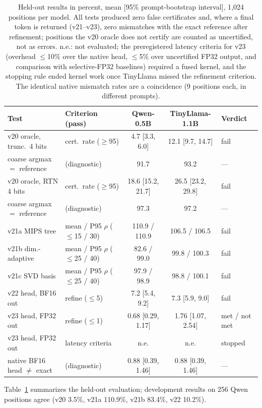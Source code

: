 \documentclass[11pt]{article}
\theoremstyle{definition}
\begin{document}
\begin{table}[t]
\centering
\scriptsize
\setlength{\tabcolsep}{4pt}
\begin{tabular}{llccl}
\toprule
Test & Criterion (pass) & Qwen-0.5B & TinyLlama-1.1B & Verdict\\
\midrule
v20 oracle, trunc.\ 4 bits & cert.\ rate ($\ge$95) & 4.7 [3.3, 6.0] & 12.1 [9.7, 14.7] & fail\\
\quad coarse argmax $=$ reference & (diagnostic) & 91.7 & 93.2 & ---\\
v20 oracle, RTN 4 bits & cert.\ rate ($\ge$95) & 18.6 [15.2, 21.7] & 26.5 [23.2, 29.8] & fail\\
\quad coarse argmax $=$ reference & (diagnostic) & 97.3 & 97.2 & ---\\
v21a MIPS tree & mean / P95 $\rho$ ($\le$15 / 30) & 110.9 / 110.9 & 106.5 / 106.5 & fail\\
v21b dim.-adaptive & mean / P95 $\rho$ ($\le$25 / 40) & 82.6 / 99.0 & 99.8 / 100.3 & fail\\
v21c SVD basis & mean / P95 $\rho$ ($\le$25 / 40) & 97.9 / 98.9 & 98.8 / 100.1 & fail\\
v22 head, BF16 out & refine ($\le$5) & 7.2 [5.4, 9.2] & 7.3 [5.9, 9.0] & fail\\
v23 head, FP32 out & refine ($\le$1) & 0.68 [0.29, 1.17] & 1.76 [1.07, 2.54] & met / not met\\
v23 head, FP32 out & latency criteria & n.e. & n.e. & stopped\\
\midrule
native BF16 head $\ne$ exact & (diagnostic) & 0.88 [0.39, 1.46] & 0.88 [0.39, 1.46] & ---\\
\bottomrule
\end{tabular}
\caption{Held-out results in percent, mean [95\% prompt-bootstrap interval], 1{,}024
positions per model. All tests produced zero false certificates and, where a final
token is returned (v21--v23), zero mismatches with the exact reference after
refinement; positions the v20 oracle does not certify are counted as uncertified,
not as errors. n.e.: not evaluated; the preregistered latency criteria for v23
(overhead $\le$10\% over the native head, $\le$5\% over uncertified FP32 output, and
comparison with selective-FP32 baselines) required a fused kernel, and the stopping
rule ended kernel work once TinyLlama missed the refinement criterion. The identical
native mismatch rates are a coincidence (9 positions each, in different prompts).}
\label{tab:main}
\end{table}

Table~\ref{tab:main} summarizes the held-out evaluation; development results on 256
Qwen positions agree (v20 3.5\%, v21a 110.9\%, v21b 83.4\%, v22 10.2\%).
\end{document}
